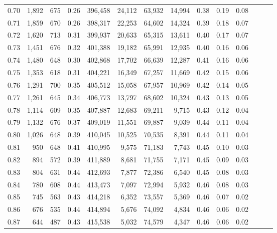 \begin{tabular}{rrrrrrrrrrrrrr}
0.70 &   1,892 &    675 &  0.26 &  396,458 &   24,112 &  63,932 &  14,994 &  0.38 &  0.19 &      0.08 \\
0.71 &   1,859 &    670 &  0.26 &  398,317 &   22,253 &  64,602 &  14,324 &  0.39 &  0.18 &      0.07 \\
0.72 &   1,620 &    713 &  0.31 &  399,937 &   20,633 &  65,315 &  13,611 &  0.40 &  0.17 &      0.07 \\
0.73 &   1,451 &    676 &  0.32 &  401,388 &   19,182 &  65,991 &  12,935 &  0.40 &  0.16 &      0.06 \\
0.74 &   1,480 &    648 &  0.30 &  402,868 &   17,702 &  66,639 &  12,287 &  0.41 &  0.16 &      0.06 \\
0.75 &   1,353 &    618 &  0.31 &  404,221 &   16,349 &  67,257 &  11,669 &  0.42 &  0.15 &      0.06 \\
0.76 &   1,291 &    700 &  0.35 &  405,512 &   15,058 &  67,957 &  10,969 &  0.42 &  0.14 &      0.05 \\
0.77 &   1,261 &    645 &  0.34 &  406,773 &   13,797 &  68,602 &  10,324 &  0.43 &  0.13 &      0.05 \\
0.78 &   1,114 &    609 &  0.35 &  407,887 &   12,683 &  69,211 &   9,715 &  0.43 &  0.12 &      0.04 \\
0.79 &   1,132 &    676 &  0.37 &  409,019 &   11,551 &  69,887 &   9,039 &  0.44 &  0.11 &      0.04 \\
0.80 &   1,026 &    648 &  0.39 &  410,045 &   10,525 &  70,535 &   8,391 &  0.44 &  0.11 &      0.04 \\
0.81 &     950 &    648 &  0.41 &  410,995 &    9,575 &  71,183 &   7,743 &  0.45 &  0.10 &      0.03 \\
0.82 &     894 &    572 &  0.39 &  411,889 &    8,681 &  71,755 &   7,171 &  0.45 &  0.09 &      0.03 \\
0.83 &     804 &    631 &  0.44 &  412,693 &    7,877 &  72,386 &   6,540 &  0.45 &  0.08 &      0.03 \\
0.84 &     780 &    608 &  0.44 &  413,473 &    7,097 &  72,994 &   5,932 &  0.46 &  0.08 &      0.03 \\
0.85 &     745 &    563 &  0.43 &  414,218 &    6,352 &  73,557 &   5,369 &  0.46 &  0.07 &      0.02 \\
0.86 &     676 &    535 &  0.44 &  414,894 &    5,676 &  74,092 &   4,834 &  0.46 &  0.06 &      0.02 \\
0.87 &     644 &    487 &  0.43 &  415,538 &    5,032 &  74,579 &   4,347 &  0.46 &  0.06 &      0.02 \\

\end{tabular}
